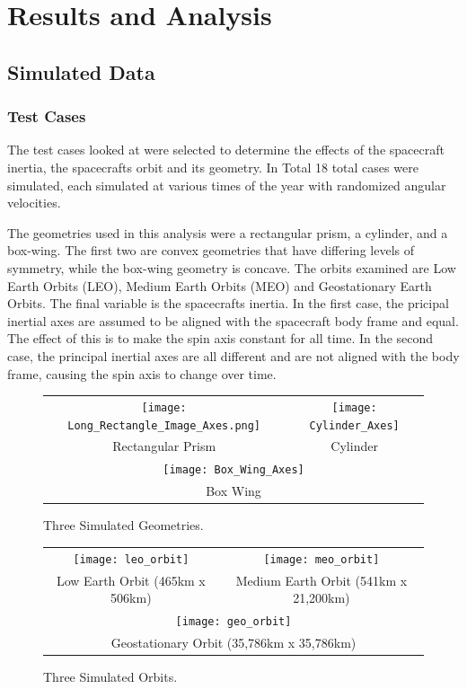 \chapter{Results and Analysis}

\section{Simulated Data}

\subsection{Test Cases}

The test cases looked at were selected to determine the effects of the spacecraft inertia, the spacecrafts orbit and its geometry. In Total 18 total cases were simulated, each simulated at various times of the year with randomized angular velocities.

The geometries used in this analysis were a rectangular prism, a cylinder, and a box-wing. The first two are convex geometries that have differing levels of symmetry, while the box-wing geometry is concave. The orbits examined are Low Earth Orbits (LEO), Medium Earth Orbits (MEO) and Geostationary Earth Orbits. The final variable is the spacecrafts inertia. In the first case, the pricipal inertial axes are assumed to be aligned with the spacecraft body frame and equal. The effect of this is to make the spin axis constant for all time. In the second case, the principal inertial axes are all different and are not aligned with the body frame, causing the spin axis to change over time.

\begin{figure}\label{simulated_geometries}
	\begin{center}
	\begin{tabular}{cc}
		\texttt{[image: Long\_Rectangle\_Image\_Axes.png]} &
		\texttt{[image: Cylinder\_Axes]} \\
		Rectangular Prism & Cylinder \\
		\multicolumn{2}{c}{\texttt{[image: Box\_Wing\_Axes]}} \\
		\multicolumn{2}{c}{Box Wing}
	\end{tabular}
	\end{center}
	\caption{Three Simulated Geometries.}
\end{figure}


\begin{figure}
	\begin{center}
	\begin{tabular}{cc}
		\texttt{[image: leo\_orbit]} &
		\texttt{[image: meo\_orbit]} \\
		Low Earth Orbit (465km x 506km) & Medium Earth Orbit (541km x 21,200km) \\
		\multicolumn{2}{c}{\texttt{[image: geo\_orbit]}} \\
		\multicolumn{2}{c}{Geostationary Orbit (35,786km x 35,786km)}
	\end{tabular}
	\end{center}
	\caption{Three Simulated Orbits.}
\end{figure}

